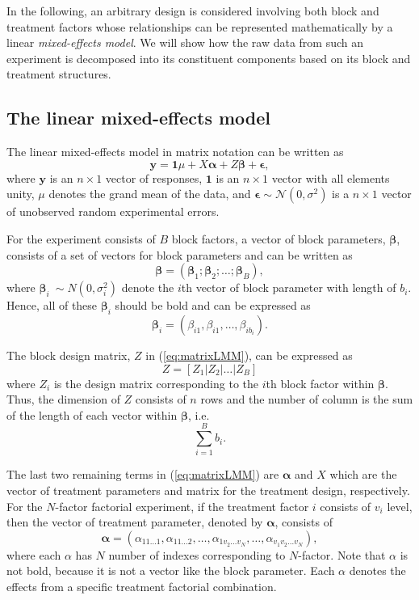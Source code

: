 \documentclass[article]{jss}
\begin{document}
In the following, an arbitrary design is considered involving both block and treatment factors whose relationships can be represented mathematically by a linear \emph{mixed-effects model}. We will show how the raw data from such an experiment is decomposed into its constituent components based on its block and treatment structures.

\subsection{The linear mixed-effects model}
\label{subsec:matrixLMM}
The linear mixed-effects model in matrix notation can be written as
\begin{equation}\label{eq:matrixLMM}
\bm{y} = \bm{1}\mu + X\bm{\alpha} + Z\bm{\beta} + \bm{\epsilon},
\end{equation}
where $\bm{y}$ is an $n \times 1$ vector of responses, $\bm{1}$ is an $n \times 1$ vector with all elements unity, $\mu$ denotes the grand mean of the data, and $\bm{\epsilon}\sim \mathcal{N}(0,\sigma^2)$ is a $n \times 1$ vector of unobserved random experimental errors. 

For the experiment consists of $B$ block factors, a vector of block parameters, $\bm{\beta}$, consists of a set of vectors for block parameters and can be written as
\begin{equation}\label{eq:block1Par}
\bm{\beta} = (\bm{\beta}_1; \bm{\beta}_2; \dots; \bm{\beta}_B), 
\end{equation} 
where $\bm{\beta}_i ~ \sim N(0, \sigma_i^2)$ denote the $i$th vector of block parameter with length of $b_i$. Hence, all of these $\bm{\beta}_i$ should be bold and can be expressed as 
\[
\bm{\beta}_i = (\beta_{i1}, \beta_{i1}, \dots, \beta_{i b_i}).
\] 

The block design matrix, $Z$ in (\ref{eq:matrixLMM}), can be expressed as 
\begin{equation}\label{eq:block1Mat}
Z = [Z_1 \vert Z_2 \vert \ldots \vert Z_B ]
\end{equation}
where $Z_i$ is the design matrix corresponding to the $i$th block factor within $\bm{\beta}$. Thus, the dimension of $Z$ consists of $n$ rows and the number of column is the sum of the length of each vector within $\bm{\beta}$, i.e.\
\[
\sum^{B}_{i = 1} b_i.
\]

The last two remaining terms in (\ref{eq:matrixLMM}) are $\bm{\alpha}$ and $X$ which are the vector of treatment parameters and matrix for the treatment design, respectively. For the $N$-factor factorial experiment, if the treatment factor $i$ consists of $v_i$ level, then the vector of treatment parameter, denoted by $\bm{\alpha}$, consists of 
\begin{equation}
\label{eq:treatPar}
\bm{\alpha} = (\alpha_{11 \dots 1}, \alpha_{11 \dots 2}, \dots,  \alpha_{1v_2 \dots v_N},\dots,\alpha_{v_1 v_2 \dots v_N}),
\end{equation}
where each $\alpha$ has $N$ number of indexes corresponding to $N$-factor. Note that $\alpha$ is not bold, because it is not a vector like the block parameter. Each $\alpha$ denotes the effects from a specific treatment factorial combination.
\end{document}
